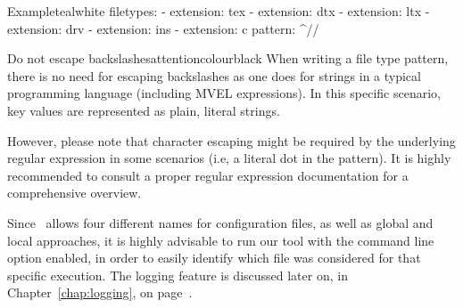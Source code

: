 \begin{description}
\begin{codebox}{Example}{teal}{\icnote}{white}
filetypes:
- extension: tex
- extension: dtx
- extension: ltx
- extension: drv
- extension: ins
- extension: c
  pattern: ^\s*//\s*
\end{codebox}

\begin{messagebox}{Do not escape backslashes}{attentioncolour}{\icattention}{black}
\setlength{\parskip}{1em}
When writing a file type pattern, there is no need for escaping backslashes as one does for strings in a typical programming language (including MVEL expressions). In this specific scenario, key values are represented as plain, literal strings.

However, please note that character escaping might be required by the underlying regular expression in some scenarios (i.e, a literal dot in the pattern). It is highly recommended to consult a proper regular expression documentation for a comprehensive overview.
\end{messagebox}
\end{description}

Since \arara\ allows four different names for configuration files, as well as global and local approaches, it is highly advisable to run our tool with the  command line option enabled, in order to easily identify which file was considered for that specific execution. The logging feature is discussed later on, in Chapter~\ref{chap:logging}, on page~\pageref{chap:logging}.
